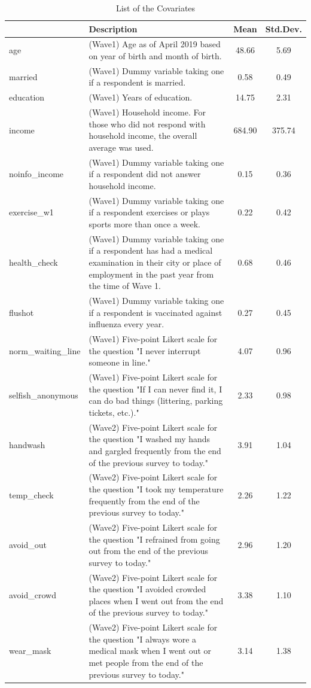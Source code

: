 \documentclass[
]{article}
\begin{document}
\begin{table}[!h]

\caption{\label{tab:covariate-list}List of the Covariates}
\centering
\fontsize{9}{11}\selectfont
\begin{tabular}[t]{l>{\raggedright\arraybackslash}p{30em}cc}
\toprule
  & Description & Mean & Std.Dev.\\
\midrule
age & (Wave1) Age as of April 2019 based on year of birth and month of birth. & \num{48.66} & \num{5.69}\\
married & (Wave1) Dummy variable taking one if a respondent is married. & \num{0.58} & \num{0.49}\\
education & (Wave1) Years of education. & \num{14.75} & \num{2.31}\\
income & (Wave1) Household income. For those who did not respond with household income, the overall average was used. & \num{684.90} & \num{375.74}\\
noinfo\_income & (Wave1) Dummy variable taking one if a respondent did not answer household income. & \num{0.15} & \num{0.36}\\
exercise\_w1 & (Wave1) Dummy variable taking one if a respondent exercises or plays sports more than once a week. & \num{0.22} & \num{0.42}\\
health\_check & (Wave1) Dummy variable taking one if a respondent has had a medical examination in their city or place of employment in the past year from the time of Wave 1. & \num{0.68} & \num{0.46}\\
flushot & (Wave1) Dummy variable taking one if a respondent is vaccinated against influenza every year. & \num{0.27} & \num{0.45}\\
norm\_waiting\_line & (Wave1) Five-point Likert scale for the question "I never interrupt someone in line." & \num{4.07} & \num{0.96}\\
selfish\_anonymous & (Wave1) Five-point Likert scale for the question "If I can never find it, I can do bad things (littering, parking tickets, etc.)." & \num{2.33} & \num{0.98}\\
handwash & (Wave2) Five-point Likert scale for the question "I washed my hands and gargled frequently from the end of the previous survey to today." & \num{3.91} & \num{1.04}\\
temp\_check & (Wave2) Five-point Likert scale for the question "I took my temperature frequently from the end of the previous survey to today." & \num{2.26} & \num{1.22}\\
avoid\_out & (Wave2) Five-point Likert scale for the question "I refrained from going out from the end of the previous survey to today." & \num{2.96} & \num{1.20}\\
avoid\_crowd & (Wave2) Five-point Likert scale for the question "I avoided crowded places when I went out from the end of the previous survey to today." & \num{3.38} & \num{1.10}\\
wear\_mask & (Wave2) Five-point Likert scale for the question "I always wore a medical mask when I went out or met people from the end of the previous survey to today." & \num{3.14} & \num{1.38}\\
\bottomrule
\end{tabular}
\end{table}
\end{document}
